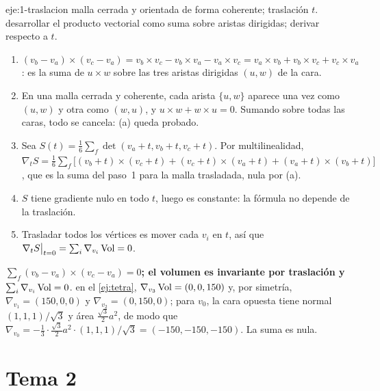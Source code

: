 \begin{solucion}{eje:1-traslacion}
\datos malla cerrada y orientada de forma coherente; traslación $t$.
\planteamiento desarrollar el producto vectorial como suma sobre aristas dirigidas; derivar respecto a $t$.
\pasos
\begin{enumerate}[label=\arabic*.]
  \item $(v_b-v_a)\times(v_c-v_a)=v_b\times v_c-v_b\times v_a-v_a\times v_c=v_a\times v_b+v_b\times v_c+v_c\times v_a$: es la suma de $u\times w$ sobre las tres aristas dirigidas $(u,w)$ de la cara.
  \item En una malla cerrada y coherente, cada arista $\{u,w\}$ aparece una vez como $(u,w)$ y otra como $(w,u)$, y $u\times w+w\times u=0$. Sumando sobre todas las caras, todo se cancela: (a) queda probado.
  \item Sea $S(t)=\tfrac16\sum_f\det(v_a+t,v_b+t,v_c+t)$. Por multilinealidad, $\nabla_tS=\tfrac16\sum_f\bigl[(v_b+t)\times(v_c+t)+(v_c+t)\times(v_a+t)+(v_a+t)\times(v_b+t)\bigr]$, que es la suma del paso~1 para la malla trasladada, nula por (a).
  \item $S$ tiene gradiente nulo en todo $t$, luego es constante: la fórmula no depende de la traslación.
  \item Trasladar todos los vértices es mover cada $v_i$ en $t$, así que $\nabla_tS\big|_{t=0}=\sum_i\nabla_{v_i}\operatorname{Vol}=0$.
\end{enumerate}
\resultado \textbf{$\sum_f(v_b-v_a)\times(v_c-v_a)=0$; el volumen es invariante por traslación y $\sum_i\nabla_{v_i}\operatorname{Vol}=0$}.
\comprobacion en el \cref{ej:tetra}, $\nabla_{v_3}\operatorname{Vol}=(0,0,150)$ y, por simetría, $\nabla_{v_1}=(150,0,0)$ y $\nabla_{v_2}=(0,150,0)$; para $v_0$, la cara opuesta tiene normal $(1,1,1)/\sqrt3$ y área $\tfrac{\sqrt3}{2}a^2$, de modo que $\nabla_{v_0}=-\tfrac13\cdot\tfrac{\sqrt3}{2}a^2\cdot(1,1,1)/\sqrt3=(-150,-150,-150)$. La suma es nula.
\end{solucion}

\section{Tema 2}

